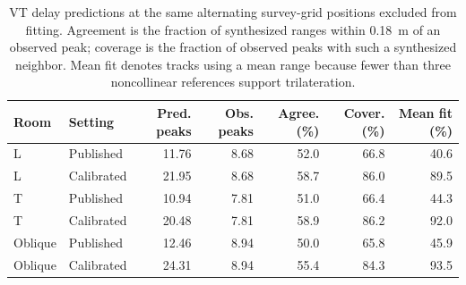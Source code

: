 \begin{table}[H]
\centering
\caption{VT delay predictions at the same alternating survey-grid positions excluded from fitting. Agreement is the fraction of synthesized ranges within 0.18~m of an observed peak; coverage is the fraction of observed peaks with such a synthesized neighbor. Mean fit denotes tracks using a mean range because fewer than three noncollinear references support trilateration.}
\label{tab:vtcheck}
\setlength{\tabcolsep}{4pt}
\begin{tabular}{llrrrrr}
\toprule
Room & Setting & Pred. peaks & Obs. peaks & Agree. (\%) & Cover. (\%) & Mean fit (\%)\\
\midrule
L & Published & 11.76 & 8.68 & 52.0 & 66.8 & 40.6\\
L & Calibrated & 21.95 & 8.68 & 58.7 & 86.0 & 89.5\\
T & Published & 10.94 & 7.81 & 51.0 & 66.4 & 44.3\\
T & Calibrated & 20.48 & 7.81 & 58.9 & 86.2 & 92.0\\
Oblique & Published & 12.46 & 8.94 & 50.0 & 65.8 & 45.9\\
Oblique & Calibrated & 24.31 & 8.94 & 55.4 & 84.3 & 93.5\\
\bottomrule
\end{tabular}
\end{table}
